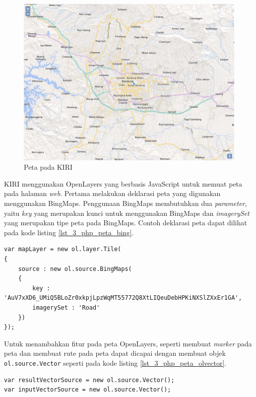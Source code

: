 \begin{figure}[H]
	\centering
	\includegraphics[scale=0.4]{Gambar/KIRI-peta}
	\caption{Peta pada KIRI} 
	\label{fig:3_KIRI_peta}
\end{figure}

KIRI menggunakan OpenLayers yang berbasis JavaScript untuk memuat peta pada halaman \textit{web}. Pertama melakukan deklarasi peta yang digunakan menggunakan BingMaps. Penggunaan BingMaps membutuhkan dua \textit{parameter}, yaitu \textit{key} yang merupakan kunci untuk menggunakan BingMaps dan \textit{imagerySet} yang merupakan tipe peta pada BingMaps. Contoh deklarasi peta dapat dilihat pada kode listing \ref{lst_3_php_peta_bing}.

\begin{lstlisting}[caption=Deklarasi peta BingMaps,label = {lst_3_php_peta_bing}]
var mapLayer = new ol.layer.Tile(
{
	source : new ol.source.BingMaps(
	{
		key : 'AuV7xXD6_UMiQ5BLoZr0xkpjLpzWqMT55772Q8XtLIQeuDebHPKiNXSlZXxEr1GA',
		imagerySet : 'Road'
	})
});
\end{lstlisting}

Untuk menambahkan fitur pada peta OpenLayers, seperti membuat \textit{marker} pada peta dan membuat rute pada peta dapat dicapai dengan membuat objek \verb!ol.source.Vector! seperti pada kode listing \ref{lst_3_php_peta_olvector}.

\begin{lstlisting}[caption=Objek ol.source.Vector,label = {lst_3_php_peta_olvector}]
var resultVectorSource = new ol.source.Vector();
var inputVectorSource = new ol.source.Vector();
\end{lstlisting}


